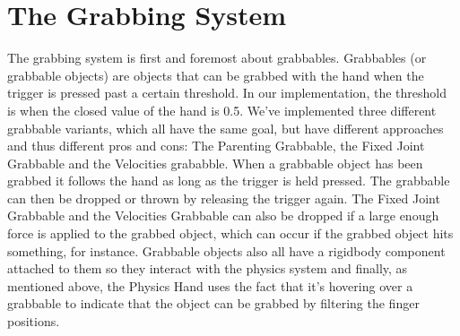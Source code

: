 \section{The Grabbing System}
\label{sec:grabbingSystem}
The grabbing system is first and foremost about grabbables. Grabbables (or grabbable objects) are objects that can be grabbed with the hand when the trigger is pressed past a certain threshold. In our implementation, the threshold is when the closed value of the hand is 0.5. We've implemented three different grabbable variants, which all have the same goal, but have different approaches and thus different pros and cons: The Parenting Grabbable, the Fixed Joint Grabbable and the Velocities grababble. When a grabbable object has been grabbed it follows the hand as long as the trigger is held pressed. The grabbable can then be dropped or thrown by releasing the trigger again. The Fixed Joint Grabbable and the Velocities Grabbable can also be dropped if a large enough force is applied to the grabbed object, which can occur if the grabbed object hits something, for instance. Grabbable objects also all have a rigidbody component attached to them so they interact with the physics system and finally, as mentioned above, the Physics Hand uses the fact that it's hovering over a grabbable to indicate that the object can be grabbed by filtering the finger positions.

